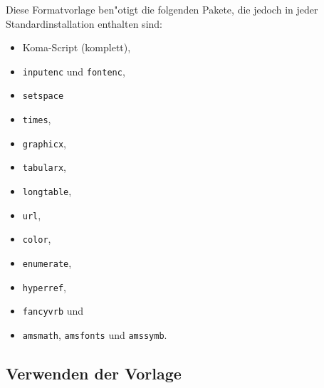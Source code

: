 \documentclass[plainarticle,zihtitle,english,final,hyperref,utf8]{zihpub}
\begin{document}
Diese Formatvorlage ben"otigt die folgenden Pakete, die jedoch in jeder Standardinstallation enthalten sind:
\begin{itemize}
	\item  Koma-Script (komplett),
	\item \texttt{inputenc} und \texttt{fontenc},
	\item \texttt{setspace}
	\item \texttt{times},
	\item \texttt{graphicx},
	\item \texttt{tabularx},
	\item \texttt{longtable},
	\item \texttt{url},
	\item \texttt{color},
	\item \texttt{enumerate},
	\item \texttt{hyperref},
	\item \texttt{fancyvrb} und
	\item \texttt{amsmath}, \texttt{amsfonts} und \texttt{amssymb}.
\end{itemize}

\subsection{Verwenden der Vorlage}
\end{document}
